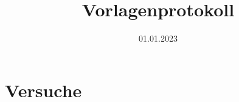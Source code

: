 
\usepackage{subfiles}

\title{Vorlagenprotokoll}
\date{01.01.2023}


\maketitle


\newpage

\newpage
\part{Versuche}

\newpage

